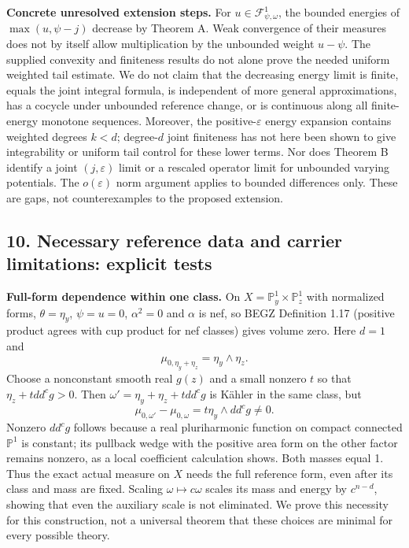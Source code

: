\documentclass[
  10pt,
]{article}
\begin{document}
\textbf{Concrete unresolved extension steps.} For
\(u\in\mathcal F^1_{\psi,\omega}\), the bounded energies of
\(\max(u,\psi-j)\) decrease by Theorem A. Weak convergence of their
measures does not by itself allow multiplication by the unbounded weight
\(u-\psi\). The supplied convexity and finiteness results do not alone
prove the needed uniform weighted tail estimate. We do not claim that
the decreasing energy limit is finite, equals the joint integral
formula, is independent of more general approximations, has a cocycle
under unbounded reference change, or is continuous along all
finite-energy monotone sequences. Moreover, the positive-\(\varepsilon\)
energy expansion contains weighted degrees \(k<d\); degree-\(d\) joint
finiteness has not here been shown to give integrability or uniform tail
control for these lower terms. Nor does Theorem B identify a joint
\((j,\varepsilon)\) limit or a rescaled operator limit for unbounded
varying potentials. The \(o(\varepsilon)\) norm argument applies to
bounded differences only. These are gaps, not counterexamples to the
proposed extension.

\subsection{10. Necessary reference data and carrier limitations:
explicit
tests}\label{necessary-reference-data-and-carrier-limitations-explicit-tests}

\textbf{Full-form dependence within one class.} On
\(X=\mathbb P^1_y\times\mathbb P^1_z\) with normalized forms,
\(\theta=\eta_y\), \(\psi=u=0\), \(\alpha^2=0\) and \(\alpha\) is nef,
so BEGZ Definition 1.17 (positive product agrees with cup product for
nef classes) gives volume zero. Here \(d=1\) and \[
\mu_{0,\eta_y+\eta_z}=\eta_y\wedge\eta_z.
\] Choose a nonconstant smooth real \(g(z)\) and a small nonzero \(t\)
so that \(\eta_z+tdd^cg>0\). Then \(\omega'=\eta_y+\eta_z+tdd^cg\) is
Kähler in the same class, but \[
\mu_{0,\omega'}-\mu_{0,\omega}=t\eta_y\wedge dd^cg\neq0.
\] Nonzero \(dd^cg\) follows because a real pluriharmonic function on
compact connected \(\mathbb P^1\) is constant; its pullback wedge with
the positive area form on the other factor remains nonzero, as a local
coefficient calculation shows. Both masses equal 1. Thus the exact
actual measure on \(X\) needs the full reference form, even after its
class and mass are fixed. Scaling \(\omega\mapsto c\omega\) scales its
mass and energy by \(c^{n-d}\), showing that even the auxiliary scale is
not eliminated. We prove this necessity for this construction, not a
universal theorem that these choices are minimal for every possible
theory.
\end{document}
